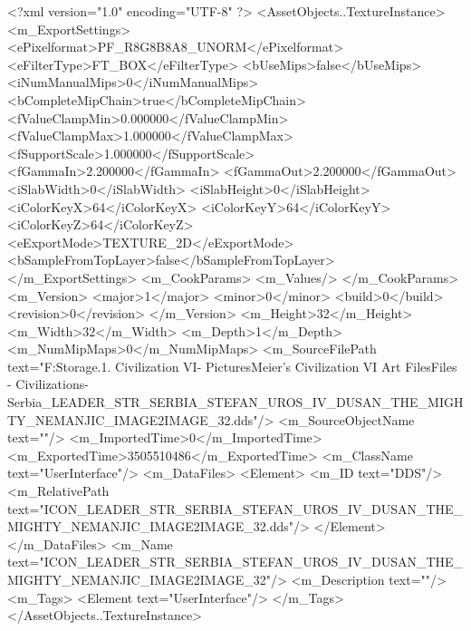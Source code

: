 <?xml version="1.0" encoding="UTF-8" ?>
<AssetObjects..TextureInstance>
	<m_ExportSettings>
		<ePixelformat>PF_R8G8B8A8_UNORM</ePixelformat>
		<eFilterType>FT_BOX</eFilterType>
		<bUseMips>false</bUseMips>
		<iNumManualMips>0</iNumManualMips>
		<bCompleteMipChain>true</bCompleteMipChain>
		<fValueClampMin>0.000000</fValueClampMin>
		<fValueClampMax>1.000000</fValueClampMax>
		<fSupportScale>1.000000</fSupportScale>
		<fGammaIn>2.200000</fGammaIn>
		<fGammaOut>2.200000</fGammaOut>
		<iSlabWidth>0</iSlabWidth>
		<iSlabHeight>0</iSlabHeight>
		<iColorKeyX>64</iColorKeyX>
		<iColorKeyY>64</iColorKeyY>
		<iColorKeyZ>64</iColorKeyZ>
		<eExportMode>TEXTURE_2D</eExportMode>
		<bSampleFromTopLayer>false</bSampleFromTopLayer>
	</m_ExportSettings>
	<m_CookParams>
		<m_Values/>
	</m_CookParams>
	<m_Version>
		<major>1</major>
		<minor>0</minor>
		<build>0</build>
		<revision>0</revision>
	</m_Version>
	<m_Height>32</m_Height>
	<m_Width>32</m_Width>
	<m_Depth>1</m_Depth>
	<m_NumMipMaps>0</m_NumMipMaps>
	<m_SourceFilePath text="F:\Mod Storage\2.1. Civilization VI\Mods\Archive - Pictures\Sid Meier's Civilization VI Art Files\Art Files - Civilizations\Civilization - Serbia\ICON_LEADER_STR_SERBIA_STEFAN_UROS_IV_DUSAN_THE_MIGHTY_NEMANJIC_IMAGE2IMAGE_32.dds"/>
	<m_SourceObjectName text=""/>
	<m_ImportedTime>0</m_ImportedTime>
	<m_ExportedTime>3505510486</m_ExportedTime>
	<m_ClassName text="UserInterface"/>
	<m_DataFiles>
		<Element>
			<m_ID text="DDS"/>
			<m_RelativePath text="ICON_LEADER_STR_SERBIA_STEFAN_UROS_IV_DUSAN_THE_MIGHTY_NEMANJIC_IMAGE2IMAGE_32.dds"/>
		</Element>
	</m_DataFiles>
	<m_Name text="ICON_LEADER_STR_SERBIA_STEFAN_UROS_IV_DUSAN_THE_MIGHTY_NEMANJIC_IMAGE2IMAGE_32"/>
	<m_Description text=""/>
	<m_Tags>
		<Element text="UserInterface"/>
	</m_Tags>
</AssetObjects..TextureInstance>


